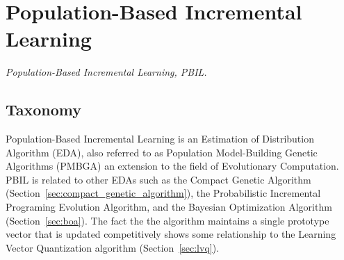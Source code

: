 

\section{Population-Based Incremental Learning} 
\label{sec:pbil}

\emph{Population-Based Incremental Learning, PBIL.}

\subsection{Taxonomy}
Population-Based Incremental Learning is an Estimation of Distribution Algorithm (EDA), also referred to as Population Model-Building Genetic Algorithms (PMBGA) an extension to the field of Evolutionary Computation.
PBIL is related to other EDAs such as the Compact Genetic Algorithm (Section~\ref{sec:compact_genetic_algorithm}), the Probabilistic Incremental Programing Evolution Algorithm, and the Bayesian Optimization Algorithm (Section~\ref{sec:boa}). The fact the the algorithm maintains a single prototype vector that is updated competitively shows some relationship to the Learning Vector Quantization algorithm (Section~\ref{sec:lvq}).

